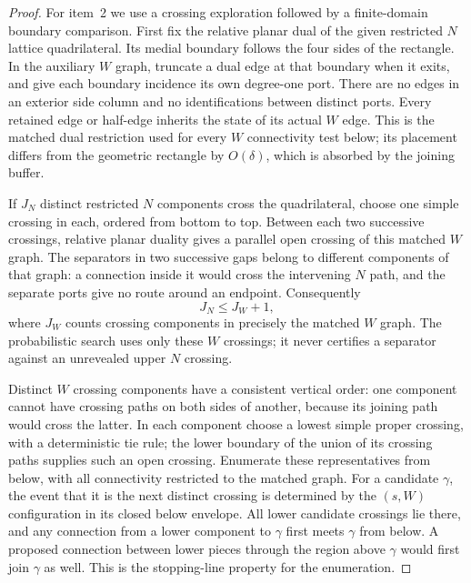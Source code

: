 \begin{proof}
For item~2 we use a crossing exploration followed by a finite-domain
boundary comparison.
First fix the relative planar dual of the given restricted $N$
lattice quadrilateral. Its medial boundary follows the four sides
of the rectangle. In the auxiliary $W$ graph, truncate a dual edge
at that boundary when it exits, and give each boundary incidence
its own degree-one port. There are no edges in an exterior side
column and no identifications between distinct ports. Every retained
edge or half-edge inherits the state of its actual $W$ edge. This is the matched dual
restriction used for every $W$ connectivity test below; its
placement differs from the geometric rectangle by $O(\delta)$,
which is absorbed by the joining buffer.

If $J_N$ distinct restricted $N$ components cross the quadrilateral,
choose one simple crossing in each, ordered from bottom to top.
Between each two successive crossings, relative planar duality gives
a parallel open crossing of this matched $W$ graph. The separators
in two successive gaps belong to different components of that graph:
a connection inside it would cross the intervening $N$ path, and
the separate ports give no route around an endpoint. Consequently
\[
                  J_N\le J_W+1,
\]
where $J_W$ counts crossing components in precisely the matched
$W$ graph. The probabilistic search uses only these $W$ crossings;
it never certifies a separator against an unrevealed upper $N$ crossing.

Distinct $W$ crossing components have a consistent vertical order:
one component cannot have crossing paths on both sides of another,
because its joining path would cross the latter. In each component
choose a lowest simple proper crossing, with a deterministic tie
rule; the lower boundary of the union of its crossing paths supplies
such an open crossing. Enumerate these representatives from below,
with all connectivity restricted to the matched graph.
For a candidate $\gamma$, the event that it is the next distinct
crossing is determined by the $(s,W)$ configuration in its closed
below envelope. All lower candidate crossings lie there, and any
connection from a lower component to $\gamma$ first meets $\gamma$
from below. A proposed connection between lower pieces through the
region above $\gamma$ would first join $\gamma$ as well. This is
the stopping-line property for the enumeration.


\end{proof}
